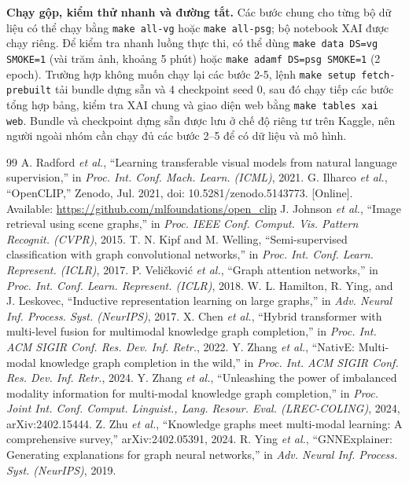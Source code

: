 \documentclass[conference]{IEEEtran}
\begin{document}
\textbf{Chạy gộp, kiểm thử nhanh và đường tắt.} Các bước chung cho từng bộ dữ liệu có thể chạy bằng \texttt{make all-vg} hoặc \texttt{make all-psg}; bộ notebook XAI được chạy riêng. Để kiểm tra nhanh luồng thực thi, có thể dùng \texttt{make data DS=vg SMOKE=1} (vài trăm ảnh, khoảng 5 phút) hoặc \texttt{make adamf DS=psg SMOKE=1} (2 epoch). Trường hợp không muốn chạy lại các bước 2-5, lệnh \texttt{make setup fetch-prebuilt} tải bundle dựng sẵn và 4 checkpoint seed 0, sau đó chạy tiếp các bước tổng hợp bảng, kiểm tra XAI chung và giao diện web bằng \texttt{make tables xai web}. Bundle và checkpoint dựng sẵn được lưu ở chế độ riêng tư trên Kaggle, nên người ngoài nhóm cần chạy đủ các bước 2--5 để có dữ liệu và mô hình.


\begin{thebibliography}{99}
 A. Radford \emph{et al.}, ``Learning transferable visual models from natural language supervision,'' in \emph{Proc. Int. Conf. Mach. Learn. (ICML)}, 2021.
 G. Ilharco \emph{et al.}, ``OpenCLIP,'' Zenodo, Jul. 2021, doi: 10.5281/zenodo.5143773. [Online]. Available: \url{https://github.com/mlfoundations/open_clip}
 J. Johnson \emph{et al.}, ``Image retrieval using scene graphs,'' in \emph{Proc. IEEE Conf. Comput. Vis. Pattern Recognit. (CVPR)}, 2015.
 T. N. Kipf and M. Welling, ``Semi-supervised classification with graph convolutional networks,'' in \emph{Proc. Int. Conf. Learn. Represent. (ICLR)}, 2017.
 P. Veli\v{c}kovi\'{c} \emph{et al.}, ``Graph attention networks,'' in \emph{Proc. Int. Conf. Learn. Represent. (ICLR)}, 2018.
 W. L. Hamilton, R. Ying, and J. Leskovec, ``Inductive representation learning on large graphs,'' in \emph{Adv. Neural Inf. Process. Syst. (NeurIPS)}, 2017.
 X. Chen \emph{et al.}, ``Hybrid transformer with multi-level fusion for multimodal knowledge graph completion,'' in \emph{Proc. Int. ACM SIGIR Conf. Res. Dev. Inf. Retr.}, 2022.
 Y. Zhang \emph{et al.}, ``NativE: Multi-modal knowledge graph completion in the wild,'' in \emph{Proc. Int. ACM SIGIR Conf. Res. Dev. Inf. Retr.}, 2024.
 Y. Zhang \emph{et al.}, ``Unleashing the power of imbalanced modality information for multi-modal knowledge graph completion,'' in \emph{Proc. Joint Int. Conf. Comput. Linguist., Lang. Resour. Eval. (LREC-COLING)}, 2024, arXiv:2402.15444.
 Z. Zhu \emph{et al.}, ``Knowledge graphs meet multi-modal learning: A comprehensive survey,'' arXiv:2402.05391, 2024.
 R. Ying \emph{et al.}, ``GNNExplainer: Generating explanations for graph neural networks,'' in \emph{Adv. Neural Inf. Process. Syst. (NeurIPS)}, 2019.

\end{thebibliography}
\end{document}
